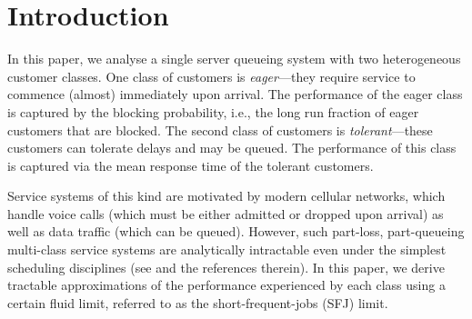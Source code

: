 
\section{Introduction}
\label{sec:intro}


In this paper, we analyse a single server queueing system with two
heterogeneous customer classes. One class of customers is {\it
  eager}---they require service to commence (almost) immediately upon
arrival.
The performance of the eager class is captured by the blocking
probability, i.e., the long run fraction of eager customers that are
blocked. The second class of customers is {\it tolerant}---these
customers can tolerate delays and may be queued. The performance of
this class is captured via the mean response time of the tolerant
customers.

Service systems of this kind are motivated by modern cellular
networks, which handle voice calls (which must be either admitted or
dropped upon arrival) as well as data traffic (which can be
queued).    
However, such part-loss, part-queueing multi-class service
systems are analytically intractable even under the simplest
scheduling disciplines (see \cite{Mahabhashyam05} and the references
therein). In this paper, we derive tractable approximations of the
performance experienced by each class using a certain fluid limit,
referred to as the short-frequent-jobs (SFJ) limit.

